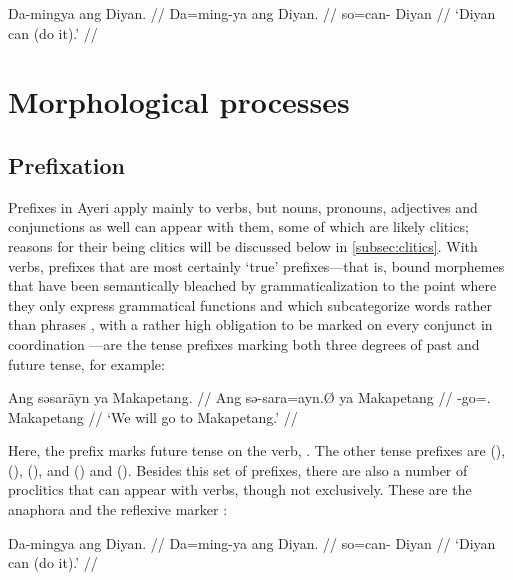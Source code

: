 \ex\begingl
	\gla Da-mingya ang Diyan. //
	\glb Da=ming-ya ang Diyan. //
	\glc so=can-\TsgM{} \Aarg{} Diyan //
	\glft `Diyan can (do it).' //
\endgl\xe

\section{Morphological processes}

\subsection{Prefixation}

Prefixes in Ayeri apply mainly to verbs, but nouns, pronouns, adjectives and
conjunctions as well can appear with them, some of which are likely clitics;
reasons for their being clitics will be discussed below in
\autoref{subsec:clitics}. With verbs, prefixes that are most certainly `true'
prefixes---that is, bound morphemes that have been semantically bleached by
grammaticalization to the point where they only express grammatical functions
\citep[157\psqq]{lehmann2015} and which subcategorize words rather than phrases
\citep[117]{klavans1985}, with a rather high obligation to be marked on every
conjunct in coordination \citep[139]{spencerluis2012}---are the tense prefixes
marking both three degrees of past and future tense, for example:

\ex\begingl
	\gla Ang səsarāyn ya Makapetang. //
	\glb Ang sə-sara=ayn.Ø ya Makapetang //
	\glc \AgtT{} \Fut{}-go=\Fpl{}.\Top{} \Loc{} Makapetang //
	\glft `We will go to Makapetang.' //
\endgl\xe

Here, the prefix  marks future tense on the verb, 
. The other tense prefixes are  
(\NPst{}),  (\Pst{}),  (\RPst{}), and 
 (\NFut{}) and  (\RFut{}). Besides this set of 
prefixes, there are also a number of proclitics that can appear with verbs, 
though not exclusively. These are the anaphora  
and the reflexive marker 
:
 
\ex\begingl
	\gla Da-mingya ang Diyan. //
	\glb Da=ming-ya ang Diyan. //
	\glc so=can-\TsgM{} \Aarg{} Diyan //
	\glft `Diyan can (do it).' //
\endgl
% 
\xe

